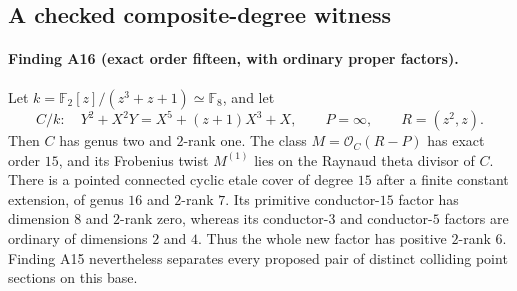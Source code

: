 \documentclass[11pt,a4paper]{article}
\begin{document}
\subsection{A checked composite-degree witness}

\paragraph{Finding A16 (exact order fifteen, with ordinary proper factors).}
Let $k=\mathbb F_2[z]/(z^3+z+1)\simeq\mathbb F_8$, and let
\[
 C/k:\quad Y^2+X^2Y=X^5+(z+1)X^3+X,\qquad
 P=\infty,\qquad R=(z^2,z).
 \tag{CE.1}
\]
Then $C$ has genus two and $2$-rank one. The class
$M=\mathcal O_C(R-P)$ has exact order $15$, and its Frobenius twist
$M^{(1)}$ lies on the Raynaud theta divisor of $C$.
There is a pointed connected cyclic etale cover of degree $15$
after a finite constant extension, of genus $16$ and $2$-rank $7$.
Its primitive conductor-$15$ factor has dimension $8$ and $2$-rank
zero, whereas its conductor-$3$ and conductor-$5$ factors are
ordinary of dimensions $2$ and $4$. Thus the whole new factor has
positive $2$-rank $6$. Finding A15 nevertheless separates every
proposed pair of distinct colliding point sections on this base.
\end{document}

